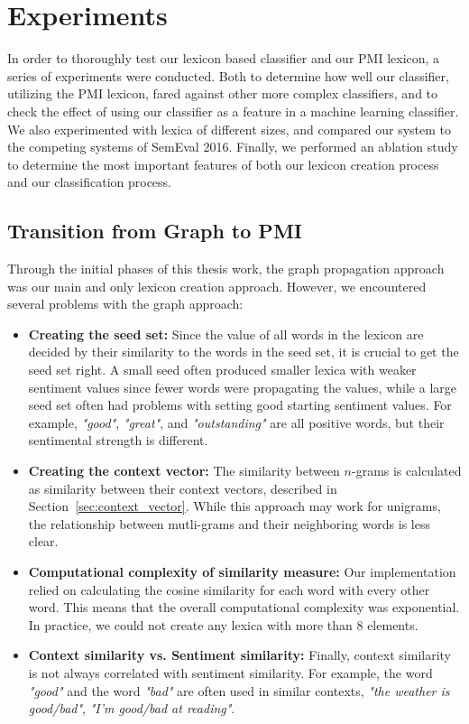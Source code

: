 \chapter{Experiments}
\label{cha:experiments}
In order to thoroughly test our lexicon based classifier and our PMI lexicon, a series of experiments were conducted. Both to determine how well our classifier, utilizing the PMI lexicon, fared against other more complex classifiers, and to check the effect of using our classifier as a feature in a machine learning classifier. We also experimented with lexica of different sizes, and compared our system to the competing systems of SemEval 2016. Finally, we performed an ablation study to determine the most important features of both our lexicon creation process and our classification process.

\section{Transition from Graph to PMI}
\label{sec:transition_graph_pmi}
Through the initial phases of this thesis work, the graph propagation approach was our main and only lexicon creation approach. However, we encountered several problems with the graph approach: 
\begin{itemize}
    \item \textbf{Creating the seed set:} Since the value of all words in the lexicon are decided by their similarity to the words in the seed set, it is crucial to get the seed set right. A small seed often produced smaller lexica with weaker sentiment values since fewer words were propagating the values, while a large seed set often had problems with setting good starting sentiment values. For example, \textit{"good"}, \textit{"great"}, and \textit{"outstanding"} are all positive words, but their sentimental strength is different.
    \item \textbf{Creating the context vector:} The similarity between $n$-grams is calculated as similarity between their context vectors, described in Section~\ref{sec:context_vector}. While this approach may work for unigrams, the relationship between mutli-grams and their neighboring words is less clear.
    \item \textbf{Computational complexity of similarity measure:} Our implementation relied on calculating the cosine similarity for each word with every other word. This means that the overall computational complexity was exponential. In practice, we could not create any lexica with more than 8 elements.
    \item \textbf{Context similarity vs. Sentiment similarity:} Finally, context similarity is not always correlated with sentiment similarity. For example, the word \textit{"good"} and the word \textit{"bad"} are often used in similar contexts, \textit{"the weather is good/bad"}, \textit{"I'm good/bad at reading"}. 
\end{itemize}

